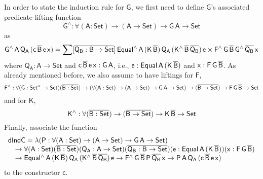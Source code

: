 \documentclass[9pt]{entcs} \usepackage{entcsmacro}
\begin{document}
In order to state the induction rule for $\mathsf{G}$,
we first need to define $\mathsf{G}$'s associated predicate-lifting function 
\[
\mathsf{G^{\wedge} : \forall (A : Set) \to (A \to Set) \to G\,A \to Set}
\]
as
\[
\mathsf{G^{\wedge}\,A\,Q_A\,(c\,\overline{B}\,e\,x)
= \sum [\overline{Q_B : B \to Set}]\,
Equal^{\wedge}\,A\,(K\,\overline{B})\,Q_A\,(K^{\wedge}\,\overline{B}\,\overline{Q_B})\,e
\times F^{\wedge}\,G\,\overline{B}\,G^{\wedge}\,{\overline{Q_B}}\,x}
\]
where $\mathsf{Q_A : A \to Set}$
and $\mathsf{c\,\overline{B}\,e\,x : G\,A}$,
i.e., $\mathsf{e : Equal\,A\,(K\,\overline{B})}$ and $\mathsf{x : F\,G\,\overline{B}}$.
As already mentioned before, we also assume to have liftings for $\mathsf{F}$,
\[
\mathsf{F^{\wedge} : \forall (G : Set^{\alpha} \to Set) (\overline{B : Set})
\to (\forall (A : Set) \to (A \to Set) \to G\,A \to Set)
\to (\overline{B \to Set})
\to F\,G\,\overline{B} \to Set}
\]
and for  $\mathsf{K}$,
\[
\mathsf{K^{\wedge} : \forall (\overline{B : Set}) \to (\overline{B \to Set}) \to K\,\overline{B} \to Set}
\]
Finally, associate the function
\[
\begin{array}{l}
\mathsf{dIndC = \lambda (P : \forall (A : Set) \to (A \to Set) \to G\,A \to Set)} \\
\quad \mathsf{\to \forall (A : Set) (\overline{B : Set}) (Q_A : A \to Set) (\overline{Q_B : B \to Set}) (e : Equal\,A\,(K\,\overline{B})) (x : F\,G\,\overline{B})} \\
\quad \mathsf{\to Equal^{\wedge}\,A\,(K\,\overline{B})\,Q_A\,(K^{\wedge}\,\overline{B}\,\overline{Q_B})\,e
	\to F^{\wedge}\,G\,\overline{B}\,P\,\overline{Q_B}\,x
	\to P\,A\,Q_A\,(c\,\overline{B}\,e\,x)}
\end{array}
\]
to the constructor $\mathsf{c}$.
\end{document}
